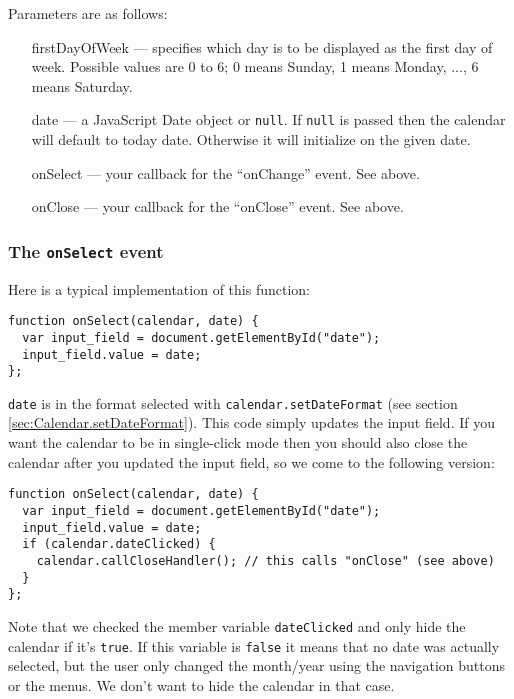 \documentclass[a4paper,10pt]{article}
\begin{document}
Parameters are as follows:

\begin{itemize}

\item [firstDayOfWeek] --- specifies which day is to be displayed as the first
  day of week.  Possible values are 0 to 6; 0 means Sunday, 1 means Monday,
  ..., 6 means Saturday.

\item [date] --- a JavaScript Date object or \texttt{null}.  If \texttt{null}
is passed then the calendar will default to today date.  Otherwise it will
initialize on the given date.

\item [onSelect] --- your callback for the ``onChange'' event.  See above.

\item [onClose] --- your callback for the ``onClose'' event.  See above.

\end{itemize}

\subsubsection*{The \texttt{onSelect} event}\label{sec:Calendar.onSelect}

Here is a typical implementation of this function:

\begin{verbatim}
function onSelect(calendar, date) {
  var input_field = document.getElementById("date");
  input_field.value = date;
};
\end{verbatim}

\noindent \texttt{date} is in the format selected with \texttt{calendar.setDateFormat}
(see section \ref{sec:Calendar.setDateFormat}).  This code simply updates the
input field.  If you want the calendar to be in single-click mode then you
should also close the calendar after you updated the input field, so we come to
the following version:

\begin{verbatim}
function onSelect(calendar, date) {
  var input_field = document.getElementById("date");
  input_field.value = date;
  if (calendar.dateClicked) {
    calendar.callCloseHandler(); // this calls "onClose" (see above)
  }
};
\end{verbatim}

\noindent Note that we checked the member variable \texttt{dateClicked} and
only hide the calendar if it's \texttt{true}.  If this variable is \texttt{false} it
means that no date was actually selected, but the user only changed the
month/year using the navigation buttons or the menus.  We don't want to hide
the calendar in that case.
\end{document}
